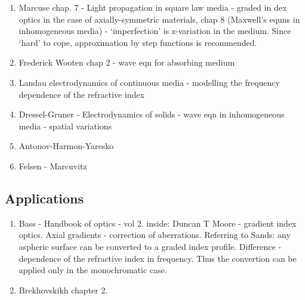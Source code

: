 \documentclass[twocolumn,secnumarabic,amssymb, nobibnotes, aps, prd]{revtex4-1}
\begin{document}
\begin{enumerate}
\item Marcuse chap. 7 - Light propagation in square law media - graded in dex optics in the case of axially-symmetric materials, chap 8 (Maxwell's equns in inhomogeneous media) - `imperfection' is z-variation in the medium. Since `hard' to cope, approximation by step functions is recommended.
\item Frederick Wooten chap 2 - wave eqn for absorbing medium
\item Landau electrodynamics of continuous media - modelling the frequency dependence of the refractive index
\item Dressel-Gruner - Electrodynamics of solids - wave eqn  in inhomogeneous media - spatial variations\\
\item Antonov-Harmon-Yaresko
\item Felsen - Marcuvitz





 
\end{enumerate}

\subsection{Applications}
\begin{enumerate}
\item Bass - Handbook of optics - vol 2. inside: Duncan T Moore - gradient index optics. Axial gradients - correction of aberrations. Referring to Sands: any aspheric surface can be converted to a graded index profile. Difference - dependence of the refractive index in frequency. Thus the convertion can be  applied only in the monochromatic case.\\
\item Brekhovskikh \cite{Brekhovskikh1960} chapter 2.
\end{enumerate}
\end{document}

